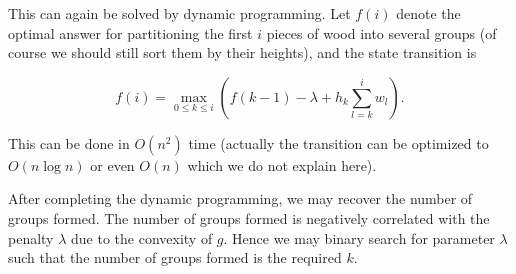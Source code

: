 \documentclass[a4paper,10.5pt,twoside]{article}
\begin{document}
\begin{itemize}
This can again be solved by dynamic programming. Let $f(i)$ denote the optimal answer for partitioning the first $i$ pieces of wood into several groups (of course we should still sort them by their heights), and the state transition is

$$ f(i) = \max_{0 \leq k \leq i} \left(f(k-1) - \lambda  + h_{k} \sum_{l = k}^i w_l \right). $$

This can be done in $O(n^2)$ time (actually the transition can be optimized to $O(n \log n)$ or even $O(n)$ which we do not explain here).

After completing the dynamic programming, we may recover the number of groups formed. The number of groups formed is negatively correlated with the penalty $\lambda$ due to the convexity of $g$. Hence we may binary search for parameter $\lambda$ such that the number of groups formed is the required $k$.
\end{itemize}
\end{document}
